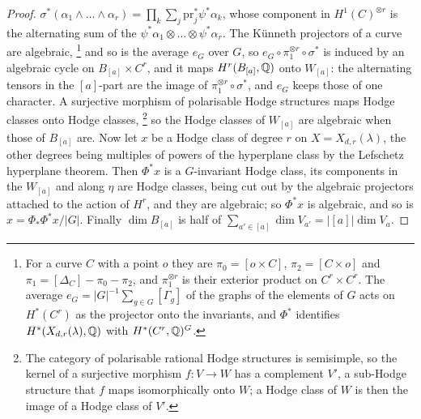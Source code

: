 \begin{proof}
$\sigma^{*}(\alpha_{1}\wedge\dots\wedge\alpha_{r})=\prod_{k}\sum_{j}
\mathrm{pr}_{j}^{*}\psi^{*}\alpha_{k}$, whose component in
$H^{1}(C)^{\otimes r}$ is the alternating sum of the
$\psi^{*}\alpha_{1}\otimes\dots\otimes\psi^{*}\alpha_{r}$. The K\"unneth
projectors of a curve are algebraic,%
\footnote{For a curve $C$ with a point $o$ they are $\pi_{0}=[o\times C]$,
$\pi_{2}=[C\times o]$ and $\pi_{1}=[\Delta_{C}]-\pi_{0}-\pi_{2}$, and
$\pi_{1}^{\otimes r}$ is their exterior product on $C^{r}\times C^{r}$. The
average $e_{G}=|G|^{-1}\sum_{g\in G}[\Gamma_{g}]$ of the graphs of the
elements of $G$ acts on $H^{*}(C^{r})$ as the projector onto the invariants,
and $\Phi^{*}$ identifies $H^{*}(X_{d,r}(\lambda),\mathbb{Q})$ with
$H^{*}(C^{r},\mathbb{Q})^{G}$.} and so is the average $e_{G}$ over $G$,
so $e_{G}\circ\pi_{1}^{\otimes r}\circ\sigma^{*}$ is induced by an algebraic
cycle on $B_{[a]}\times C^{r}$, and it maps $H^{r}(B_{[a]},\mathbb{Q})$ onto
$W_{[a]}$: the alternating tensors in the $[a]$-part are the image of
$\pi_{1}^{\otimes r}\circ\sigma^{*}$, and $e_{G}$ keeps those of one
character. A surjective morphism of polarisable Hodge structures maps Hodge
classes onto Hodge classes,%
\footnote{The category of polarisable rational Hodge structures is semisimple,
so the kernel of a surjective morphism $f\colon V\to W$ has a complement
$V'$, a sub-Hodge structure that $f$ maps isomorphically onto $W$; a Hodge
class of $W$ is then the image of a Hodge class of $V'$.} so the Hodge classes of $W_{[a]}$ are algebraic
when those of $B_{[a]}$ are. Now let $x$ be a Hodge class of degree $r$ on
$X=X_{d,r}(\lambda)$, the other degrees being multiples of powers of the
hyperplane class by the Lefschetz hyperplane theorem. Then $\Phi^{*}x$ is a
$G$-invariant Hodge class, its components in the $W_{[a]}$ and along $\eta$
are Hodge classes, being cut out by the algebraic projectors attached to
the action of $H^{r}$, and they are algebraic; so $\Phi^{*}x$ is algebraic,
and so is $x=\Phi_{*}\Phi^{*}x/|G|$.\enlargethispage{2pt} Finally $\dim B_{[a]}$ is half of
$\sum_{a'\in[a]}\dim V_{a'}=|[a]|\dim V_{a}$.
\end{proof}

